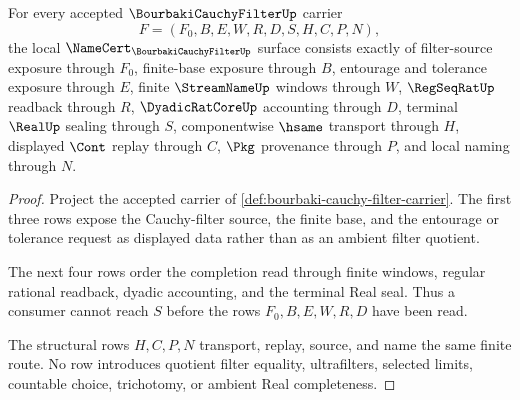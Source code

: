 \begin{theorem}
\label{thm:bourbaki-cauchy-filter-namecert-obligations}
For every accepted $\BourbakiCauchyFilterUp$ carrier
$$
F=(F_0,B,E,W,R,D,S,H,C,P,N),
$$
the local $\NameCert_{\BourbakiCauchyFilterUp}$ surface consists exactly of filter-source exposure through $F_0$, finite-base exposure through $B$, entourage and tolerance exposure through $E$, finite $\StreamNameUp$ windows through $W$, $\RegSeqRatUp$ readback through $R$, $\DyadicRatCoreUp$ accounting through $D$, terminal $\RealUp$ sealing through $S$, componentwise $\hsame$ transport through $H$, displayed $\Cont$ replay through $C$, $\Pkg$ provenance through $P$, and local naming through $N$.
\end{theorem}
\begin{proof}
Project the accepted carrier of \autoref{def:bourbaki-cauchy-filter-carrier}. The first three rows expose the Cauchy-filter source, the finite base, and the entourage or tolerance request as displayed data rather than as an ambient filter quotient.

The next four rows order the completion read through finite windows, regular rational readback, dyadic accounting, and the terminal Real seal. Thus a consumer cannot reach $S$ before the rows $F_0,B,E,W,R,D$ have been read.

The structural rows $H,C,P,N$ transport, replay, source, and name the same finite route. No row introduces quotient filter equality, ultrafilters, selected limits, countable choice, trichotomy, or ambient Real completeness.
\end{proof}

